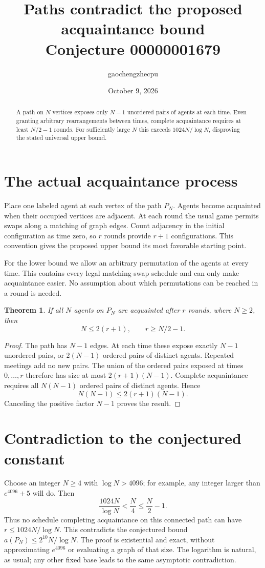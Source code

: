 \documentclass[11pt]{article}
\title{Paths contradict the proposed acquaintance bound\\Conjecture 00000001679}
\author{gaochengzhecpu}
\date{October 9, 2026}
\newtheorem{theorem}{Theorem}
\begin{document}
\maketitle
\begin{abstract}
A path on $N$ vertices exposes only $N-1$ unordered pairs of agents at
each time. Even granting arbitrary rearrangements between times, complete
acquaintance requires at least $N/2-1$ rounds. For sufficiently large $N$
this exceeds $1024N/\log N$, disproving the stated universal upper bound.
\end{abstract}

\section{The actual acquaintance process}
Place one labeled agent at each vertex of the path $P_N$. Agents become
acquainted when their occupied vertices are adjacent. At each round the
usual game permits swaps along a matching of graph edges. Count adjacency
in the initial configuration as time zero, so $r$ rounds provide $r+1$
configurations. This convention gives the proposed upper bound its most
favorable starting point.

For the lower bound we allow an arbitrary permutation of the agents at
every time. This contains every legal matching-swap schedule and can only
make acquaintance easier. No assumption about which permutations can be
reached in a round is needed.

\begin{theorem}
If all $N$ agents on $P_N$ are acquainted after $r$ rounds, where $N\geq2$,
then
\[
 N\leq2(r+1),\qquad r\geq N/2-1.
\]
\end{theorem}
\begin{proof}
The path has $N-1$ edges. At each time these expose exactly $N-1$ unordered
pairs, or $2(N-1)$ ordered pairs of distinct agents. Repeated meetings add
no new pairs. The union of the ordered pairs exposed at times $0,\ldots,r$
therefore has size at most $2(r+1)(N-1)$. Complete acquaintance requires all
$N(N-1)$ ordered pairs of distinct agents. Hence
\[
 N(N-1)\leq2(r+1)(N-1).
\]
Canceling the positive factor $N-1$ proves the result.
\end{proof}

\section{Contradiction to the conjectured constant}
Choose an integer $N\geq4$ with $\log N>4096$; for example, any integer
larger than $e^{4096}+5$ will do. Then
\[
 \frac{1024N}{\log N}<\frac N4\leq\frac N2-1.
\]
Thus no schedule completing acquaintance on this connected path can have
$r\leq1024N/\log N$. This contradicts the conjectured bound
$a(P_N)\leq2^{10}N/\log N$. The proof is existential and exact, without
approximating $e^{4096}$ or evaluating a graph of that size.
The logarithm is natural, as usual; any other fixed base leads to the
same asymptotic contradiction.
\end{document}
